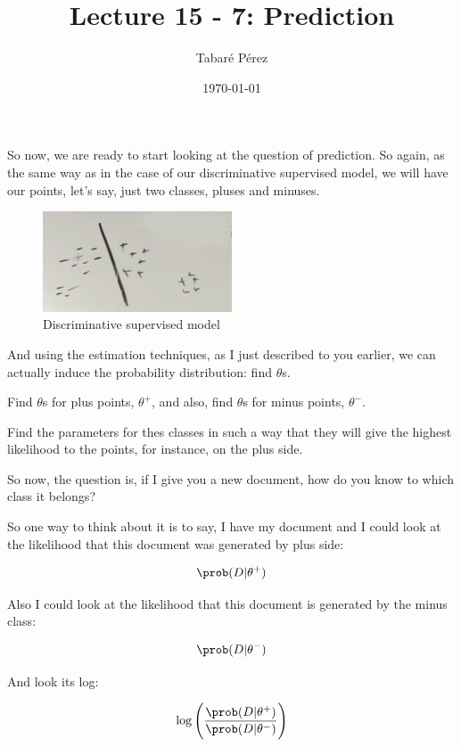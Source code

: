 \documentclass[a4paper, 12pt]{article}
\author{Tabaré Pérez}
\date{\today}
\title{Lecture 15 - 7: Prediction}
\begin{document}
\maketitle
So now, we are ready to start looking at the question of prediction. So again,
as the same way as in the case of our discriminative supervised model, we will
have our points, let's say, just two classes, pluses and minuses.

\begin{figure}[H]
\centering
\includegraphics[width=0.5\textwidth]{./pic/u04-07-fig-01.png}
\caption{\label{fig:orgd4afa36}Discriminative supervised model}
\end{figure}

And using the estimation techniques, as I just described to you earlier, we can
actually induce the probability distribution: find \(\theta\)s.

Find \(\theta\)s for plus points, \(\theta^+\), and also, find \(\theta\)s for
minus points, \(\theta^-\).

Find the parameters for thes classes in such a way that they will give the
highest likelihood to the points, for instance, on the plus side.

So now, the question is, if I give you a new document, how do you know to which
class it belongs?

So one way to think about it is to say, I have my document and I could look
at the likelihood that this document was generated by plus side:

\begin{equation}
\prob(D|\theta^+)
\end{equation}

Also I could look at the likelihood that this document is generated by the minus
class:

\begin{equation}
\prob(D|\theta^-)
\end{equation}

And look its log:

\begin{equation}
\log \left( \frac{\prob(D|\theta^{+})}{\prob(D|\theta^{-})} \right)
\end{equation}
\end{document}
